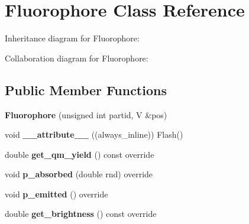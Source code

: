 \hypertarget{classFluorophore}{}\section{Fluorophore Class Reference}
\label{classFluorophore}


Inheritance diagram for Fluorophore\+:


Collaboration diagram for Fluorophore\+:
\subsection*{Public Member Functions}
\begin{DoxyCompactItemize}
\item 
\mbox{\label{classFluorophore_a63ac8f8d9289d04686ff342383ae42a0}} 
{\bfseries Fluorophore} (unsigned int partid, V \&pos)
\item 
\mbox{\label{classFluorophore_a8ca1126fd02ffc70fa2f36246c256baa}} 
void {\bfseries \+\_\+\+\_\+attribute\+\_\+\+\_\+} ((always\+\_\+inline)) Flash()
\item 
\mbox{\label{classFluorophore_a01d919a37e076034e0ea9837d4693b77}} 
double {\bfseries get\+\_\+qm\+\_\+yield} () const override
\item 
\mbox{\label{classFluorophore_adca989e3435024a8c7fe21808aa166d7}} 
void {\bfseries p\+\_\+absorbed} (double rnd) override
\item 
\mbox{\label{classFluorophore_ae19033635a230c560c4bc0398f86d42e}} 
void {\bfseries p\+\_\+emitted} () override
\item 
\mbox{\label{classFluorophore_aa573b825a081d2963b838845618ce6ff}} 
double {\bfseries get\+\_\+brightness} () const override
\end{DoxyCompactItemize}
